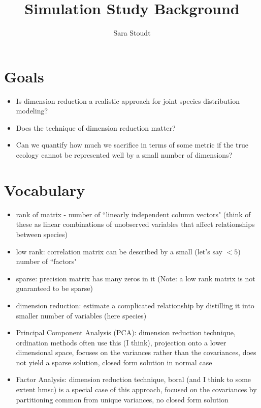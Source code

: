 \documentclass[12pt]{amsart}
\title{Simulation Study Background}
\author{Sara Stoudt}
\begin{document}
\maketitle

\section{Goals}

\begin{itemize}
\item Is dimension reduction a realistic approach for joint species distribution modeling?
\item Does the technique of dimension reduction matter?
\item Can we quantify how much we sacrifice in terms of some metric if the true ecology cannot be represented well by a small number of dimensions?

\end{itemize}

\section{Vocabulary}

\begin{itemize}
\item rank of matrix - number of ``linearly independent column vectors" (think of these as linear combinations of unobserved variables that affect relationships between species)

\item low rank: correlation matrix can be described by a small (let's say $<5$) number of ``factors"
\item sparse: precision matrix has many zeros in it (Note: a low rank matrix is not guaranteed to be sparse)

\item dimension reduction: estimate a complicated relationship by distilling it into smaller number of variables (here species)

\item Principal Component Analysis (PCA): dimension reduction technique, ordination methods often use this (I think), projection onto a lower dimensional space, focuses on the variances rather than the covariances, does not yield a sparse solution, closed form solution in normal case
\item Factor Analysis: dimension reduction technique, boral (and I think to some extent hmsc) is a special case of this approach, focused on the covariances by partitioning common from unique variances, no closed form solution


\end{itemize}
\end{document}
